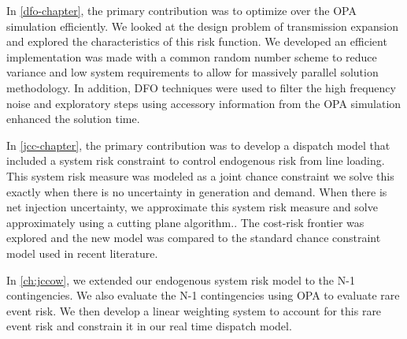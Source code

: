 In \cref{dfo-chapter}, the primary contribution was to optimize over the OPA simulation efficiently.  We looked at the design problem of transmission expansion and explored the characteristics of this risk function.  We developed an efficient implementation was made with a common random number scheme to reduce variance and low system requirements to allow for massively parallel solution methodology.  In addition, DFO techniques were used to filter the high frequency noise and exploratory steps using accessory information from the OPA simulation enhanced the solution time.

In \cref{jcc-chapter}, the primary contribution was to develop a dispatch model that included a system risk constraint to control endogenous risk from line loading.  This system risk measure was modeled as a joint chance constraint we solve this exactly when there is no uncertainty in generation and demand.  When there is net injection uncertainty, we approximate this system risk measure and solve approximately using a cutting plane algorithm..  The cost-risk frontier was explored and the new model was compared to the standard chance constraint model used in recent literature.  

In \cref{ch:jccow}, we extended our endogenous system risk model to the N-1 contingencies.  We also evaluate the N-1 contingencies using OPA to evaluate rare event risk.  We then develop a linear weighting system to account for this rare event risk and constrain it in our real time dispatch model.

	
		

\clearpage

